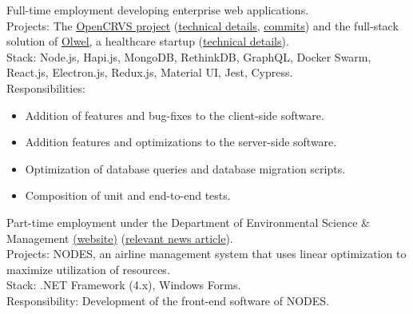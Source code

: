 \documentclass[10pt,a4paper,ragged2e]{altacv}
\begin{document}
\medskip

\small Full-time employment developing enterprise web applications.\\
\smallskip
\small Projects: The \href{https://www.dsinnovators.com/projects/open-crvs}{\underline{OpenCRVS project}} (\href{https://www.dsinnovators.com/casestudies/open-crvs-2}{\underline{technical details}}, \href{https://github.com/opencrvs/opencrvs-core/commits?author=maacpiash}{\underline{commits}}) and the full-stack solution of \href{https://www.dsinnovators.com/projects/olwel}{\underline{Olwel}}, a healthcare startup (\href{https://www.dsinnovators.com/casestudies/olwel-2}{\underline{technical details}}).\\
\smallskip
Stack: Node.js, Hapi.js, MongoDB, RethinkDB, GraphQL, Docker Swarm, React.js, Electron.js, Redux.js, Material UI, Jest, Cypress.\\
\smallskip
Responsibilities:
\begin{itemize}
\item Addition of features and bug-fixes to the client-side software.
\item Addition features and optimizations to the server-side software.
\item Optimization of database queries and database migration scripts.
\item Composition of unit and end-to-end tests.
\end{itemize}

\medskip

\small Part-time employment under the Department of Environmental Science \& Management \href{http://www.northsouth.edu/academic/shls/esm/}{\underline{(website)}} (\href{http://www.ipsnews.net/2017/05/flying-green-in-bangladesh}{\underline{relevant news article}}).\\
\smallskip
\small Projects: NODES, an airline management system that uses linear optimization to maximize utilization of resources.\\
\smallskip
Stack: .NET Framework (4.x), Windows Forms.\\
\smallskip
Responsibility: Development of the front-end software of NODES.

\medskip
\end{document}
